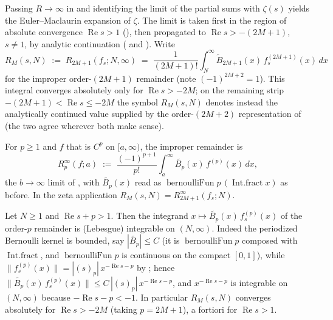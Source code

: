 Passing $R \to \infty$ in  and identifying the limit of the partial
sums with $\zeta(s)$ yields the Euler--Maclaurin expansion of $\zeta$. The limit is taken
first in the region of absolute convergence $\operatorname{Re} s > 1$
(), then propagated to
$\operatorname{Re} s > -(2M+1)$, $s \neq 1$, by analytic continuation
( and ). Write
\[
  R_M(s,N) \;:=\; R_{2M+1}(f_s; N, \infty)
  \;=\; \frac{1}{(2M+1)!}\int_N^{\infty} \widetilde{B}_{2M+1}(x)\,f_s^{(2M+1)}(x)\,dx
\]
for the improper order-$(2M+1)$ remainder (note $(-1)^{2M+2} = 1$). This integral converges
absolutely only for $\operatorname{Re} s > -2M$; on the remaining strip
$-(2M+1) < \operatorname{Re} s \le -2M$ the symbol $R_M(s,N)$ denotes instead the
analytically continued value supplied by the order-$(2M+2)$ representation of
 (the two agree wherever both make sense).

\begin{definition}
\label{def:em_remainder_Ioi}
\leanok
{}
For $p \ge 1$ and $f$ that is $C^p$ on $[a,\infty)$, the improper remainder is
\[
  R_p^{\infty}(f; a) \;:=\; \frac{(-1)^{p+1}}{p!}\int_a^{\infty} \widetilde{B_p}(x)\, f^{(p)}(x)\,dx,
\]
the $b \to \infty$ limit of , with $\widetilde{B_p}(x)$ read as
$\operatorname{bernoulliFun} p\,(\operatorname{Int.fract} x)$ as before. In the zeta
application $R_M(s,N) = R_{2M+1}^{\infty}(f_s; N)$.
\end{definition}

\begin{lemma}
\label{lem:integrable_rem_zeta}
\leanok
{}
Let $N \ge 1$ and $\operatorname{Re} s + p > 1$. Then the integrand
$x \mapsto \widetilde{B_p}(x)\,f_s^{(p)}(x)$ of the order-$p$ remainder is (Lebesgue)
integrable on $(N, \infty)$. Indeed the periodized Bernoulli kernel is bounded, say
$|\widetilde{B_p}| \le C$ (it is $\operatorname{bernoulliFun} p$ composed with
$\operatorname{Int.fract}$, and $\operatorname{bernoulliFun} p$ is continuous on the compact
$[0,1]$), while $\|f_s^{(p)}(x)\| = |(s)_p|\,x^{-\operatorname{Re} s - p}$ by
; hence $\|\widetilde{B_p}(x)\,f_s^{(p)}(x)\| \le
C\,|(s)_p|\,x^{-\operatorname{Re} s - p}$, and $x^{-\operatorname{Re} s - p}$ is integrable on
$(N,\infty)$ because $-\operatorname{Re} s - p < -1$. In particular $R_M(s,N)$ converges
absolutely for $\operatorname{Re} s > -2M$ (taking $p = 2M+1$), a fortiori for
$\operatorname{Re} s > 1$.
\end{lemma}

